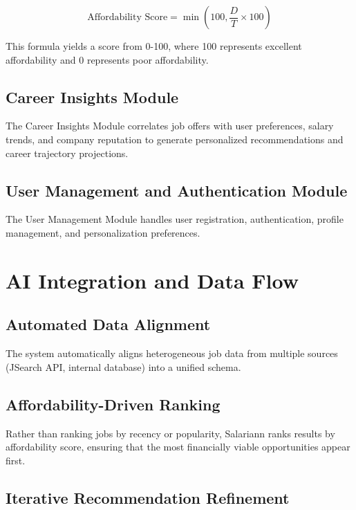 \begin{equation}
\text{Affordability Score} = \min\left(100, \frac{D}{T} \times 100\right)
\end{equation}

This formula yields a score from 0-100, where 100 represents excellent affordability and 0 represents poor affordability.

\subsection{Career Insights Module}

The Career Insights Module correlates job offers with user preferences, salary trends, and company reputation to generate personalized recommendations and career trajectory projections.

\subsection{User Management and Authentication Module}

The User Management Module handles user registration, authentication, profile management, and personalization preferences.

\section{AI Integration and Data Flow}

\subsection{Automated Data Alignment}

The system automatically aligns heterogeneous job data from multiple sources (JSearch API, internal database) into a unified schema.

\subsection{Affordability-Driven Ranking}

Rather than ranking jobs by recency or popularity, Salariann ranks results by affordability score, ensuring that the most financially viable opportunities appear first.

\subsection{Iterative Recommendation Refinement}


